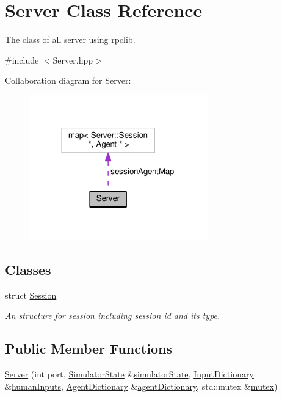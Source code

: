 \hypertarget{classServer}{}\section{Server Class Reference}
\label{classServer}


The class of all server using rpclib.  




{\ttfamily \#include $<$Server.\+hpp$>$}



Collaboration diagram for Server\+:\nopagebreak
\begin{figure}[H]
\begin{center}
\leavevmode
\includegraphics[width=219pt]{classServer__coll__graph}
\end{center}
\end{figure}
\subsection*{Classes}
\begin{DoxyCompactItemize}
\item 
struct \hyperlink{structServer_1_1Session}{Session}
\begin{DoxyCompactList}\small\item\em An structure for session including session id and its type. \end{DoxyCompactList}\end{DoxyCompactItemize}
\subsection*{Public Member Functions}
\begin{DoxyCompactItemize}
\item 
\hyperlink{classServer_a574f6493828dccb18a0ca6a86ee7dfa4}{Server} (int port, \hyperlink{main_8hpp_a4cb9f4bcd812094244f1949a88671bb8}{Simulator\+State} \&\hyperlink{classServer_a1e6a901e88f3a8b2d2fea253e32952e4}{simulator\+State}, \hyperlink{Server_8hpp_a49cc8333bde52a7f1eb36bdb3e4e8a06}{Input\+Dictionary} \&\hyperlink{classServer_a3d62b0bc3c31161790b118717a4c4718}{human\+Inputs}, \hyperlink{Server_8hpp_acc6d6e73aa06631da7c2f627f9979d64}{Agent\+Dictionary} \&\hyperlink{classServer_ae45bd58f8585e0c47e5140a055cad09c}{agent\+Dictionary}, std\+::mutex \&\hyperlink{classServer_a9a508fe15f3a6e3b2e3750b0ff2d5798}{mutex})
\end{DoxyCompactItemize}
